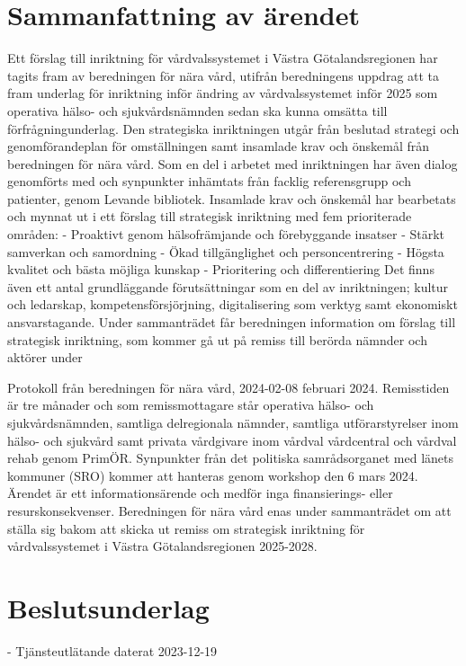 \section*{Sammanfattning av ärendet}
Ett förslag till inriktning för vårdvalssystemet i Västra Götalandsregionen har tagits fram av beredningen för nära vård, utifrån beredningens uppdrag att ta fram underlag för inriktning inför ändring av vårdvalssystemet inför 2025 som operativa hälso- och sjukvårdsnämnden sedan ska kunna omsätta till förfrågningunderlag.
Den strategiska inriktningen utgår från beslutad strategi och genomförandeplan för omställningen samt insamlade krav och önskemål från beredningen för nära vård. Som en del i arbetet med inriktningen har även dialog genomförts med och synpunkter inhämtats från facklig referensgrupp och patienter, genom Levande bibliotek.
Insamlade krav och önskemål har bearbetats och mynnat ut i ett förslag till strategisk inriktning med fem prioriterade områden:
- Proaktivt genom hälsofrämjande och förebyggande insatser
- Stärkt samverkan och samordning
- Ökad tillgänglighet och personcentrering
- Högsta kvalitet och bästa möjliga kunskap
- Prioritering och differentiering
Det finns även ett antal grundläggande förutsättningar som en del av inriktningen; kultur och ledarskap, kompetensförsjörjning, digitalisering som verktyg samt ekonomiskt ansvarstagande.
Under sammanträdet får beredningen information om förslag till strategisk inriktning, som kommer gå ut på remiss till berörda nämnder och aktörer under

Protokoll från beredningen för nära vård, 2024-02-08
februari 2024. Remisstiden är tre månader och som remissmottagare står operativa hälso- och sjukvårdsnämnden, samtliga delregionala nämnder, samtliga utförarstyrelser inom hälso- och sjukvård samt privata vårdgivare inom vårdval vårdcentral och vårdval rehab genom PrimÖR. Synpunkter från det politiska samrådsorganet med länets kommuner (SRO) kommer att hanteras genom workshop den 6 mars 2024.
Ärendet är ett informationsärende och medför inga finansierings- eller resurskonsekvenser.
Beredningen för nära vård enas under sammanträdet om att ställa sig bakom att skicka ut remiss om strategisk inriktning för vårdvalssystemet i Västra
Götalandsregionen 2025-2028.
\section*{Beslutsunderlag}
- Tjänsteutlätande daterat 2023-12-19